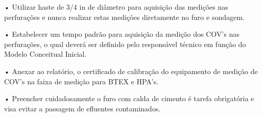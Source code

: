 • Utilizar haste de 3/4 in de diâmetro para aquisição das 
medições nas perfurações e nunca realizar estas medições 
diretamente no furo e sondagem.

• Estabelecer um tempo padrão para aquisição da medição dos 
COV’s nas perfurações, o qual deverá ser definido pelo 
responsável técnico em função do Modelo Conceitual Inicial.

• Anexar ao relatório, o certificado de calibração do 
equipamento de medição de COV’s na faixa de medição para 
BTEX e HPA’s.

• Preencher cuidadosamente o furo com calda de cimento é 
tarefa obrigatória e visa evitar a passagem de efluentes 
contaminados.

